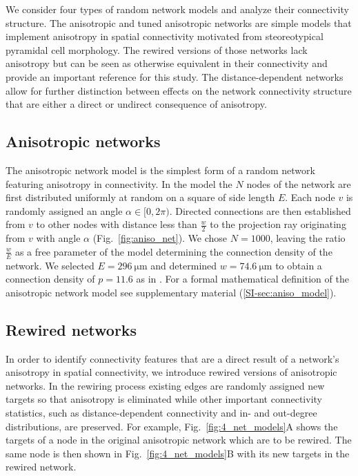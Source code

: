 
We consider four types of random network models and analyze their
connectivity structure. The anisotropic and tuned anisotropic networks
are simple models that implement anisotropy in spatial connectivity
motivated from steoreotypical pyramidal cell morphology. The rewired
versions of those networks lack anisotropy but can be seen as
otherwise equivalent in their connectivity and provide an important
reference for this study. The distance-dependent networks allow for
further distinction between effects on the network connectivity
structure that are either a direct or undirect consequence of
anisotropy.

\subsection*{Anisotropic networks}

The anisotropic network model is the simplest form of a random network
featuring anisotropy in connectivity. In the model the $N$ nodes of
the network are first distributed uniformly at random on a square of
side length $E$. Each node $v$ is randomly assigned an angle
$\alpha \in [0,2\pi)$. Directed connections are then established from
$v$ to other nodes with distance less than $\frac{w}{2}$ to the
projection ray originating from $v$ with angle $\alpha$
(Fig.~\ref{fig:aniso_net}). We chose $N=1000$, leaving the ratio
$\frac{w}{E}$ as a free parameter of the model determining the
connection density of the network. We selected
$E=\SI{296}{\micro\meter}$ and determined $w=\SI{74.6}%
{\micro\meter}$ to obtain a connection density of $p=11.6$ as in
\cite{Song2005}. For a formal mathematical definition of the
anisotropic network model see supplementary material
(\ref{SI-sec:aniso_model}).






\bigskip

\subsection*{Rewired networks}
%
In order to identify connectivity features that are a direct result of
a network's anisotropy in spatial connectivity, we introduce rewired
versions of anisotropic networks. In the rewiring process existing
edges are randomly assigned new targets so that anisotropy is
eliminated while other important connectivity statistics, such as
distance-dependent connectivity and in- and out-degree distributions,
are preserved. For example, Fig.~\ref{fig:4_net_models}A shows the
targets of a node in the original anisotropic network which are to be
rewired. The same node is then shown in Fig.~\ref{fig:4_net_models}B
with its new targets in the rewired network.
%

